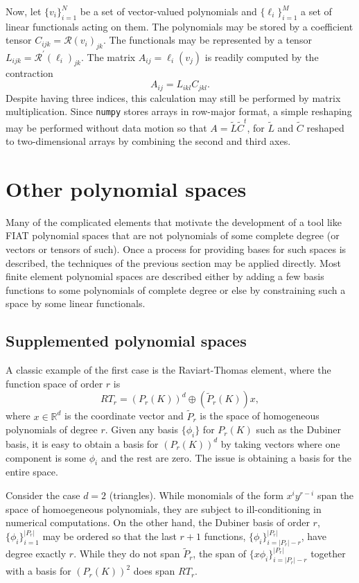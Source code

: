 Now, let \( \{ v_i \}_{i=1}^N \) be a set of vector-valued polynomials
and \( \{ \ell_i \}_{i=1}^M \) a set of linear functionals acting on
them.  The polynomials may be stored by a coefficient tensor \(
C_{ijk} = \mathcal{R}(v_i)_{jk} \).  The functionals may be
represented by a tensor \( L_{ijk} = \mathcal{R}^\prime(\ell_i)_{jk}
\).  The matrix \( A_{ij} = \ell_i(v_j) \) is readily computed by the
contraction
\[
A_{ij} = L_{ikl} C_{jkl}.
\]
Despite having three indices, this calculation may still be performed by
matrix multiplication.  Since \texttt{numpy} stores arrays in row-major
format, a simple reshaping may be performed without data motion
so that \( A = \tilde{L} \tilde{C}^t \), for \( \tilde{L} \) and \(
\tilde{C} \) reshaped to two-dimensional arrays by combining the
second and third axes.



\section{Other polynomial spaces}
Many of the complicated elements that motivate the development of a
tool like FIAT polynomial spaces that are not polynomials of
some complete degree (or vectors or tensors of such).   Once
a process for providing bases for such spaces is described, the
techniques of the previous section may be applied directly.  Most
finite element polynomial spaces are described either by adding a few
basis functions to some polynomials of complete degree or else by
constraining such a space by some linear functionals.

\subsection{Supplemented polynomial spaces}
A classic example of the first case is the Raviart-Thomas element,
where the function space of order \(r \) is
\[
RT_r = \left( P_r(K) \right)^d \oplus \left( \tilde{P}_r(K) \right) x,
\]
where \( x \in \mathbb{R}^d \) is the coordinate vector and
\( \tilde{P}_r \) is the space of homogeneous polynomials of degree \(
r \).  
Given any basis \( \{ \phi_i \} \) for \( P_r(K) \) such as the
Dubiner basis, it is easy to obtain a basis for \( (P_r(K))^d \) by
taking vectors where one component is some \( \phi_i \) and the rest
are zero.  The issue is obtaining a basis for the entire space.

Consider the case \( d = 2 \) (triangles).  While monomials of the
form
\(
x^i y^{r-i}
\) span the space of homoegeneous
polynomials, they are subject to ill-conditioning in numerical computations.
On the other hand, the Dubiner basis 
of order \( r \), \( \{ \phi_i \}_{i=1}^{|P_r|} \) 
may be ordered so that the last \( r + 1 \) functions,
\( \{ \phi_i \}_{i=|P_r|-r}^{|P_r|} \), have degree exactly \( r \).
While they do not span \( \tilde{P}_r \), the span of 
\( \{ x \phi_i \}_{i=|P_r|-r}^{|P_r|} \) together with a basis for \(
(P_r(K))^2 \) does span \( RT_r \).

